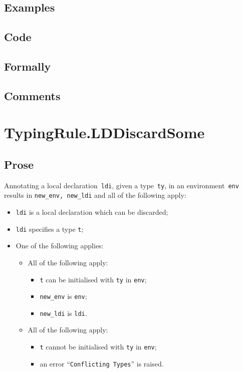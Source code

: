 \documentclass{book}
\begin{document}
  \subsection{Examples}

  \subsection{Code}

  \subsection{Formally}

  \subsection{Comments}

\section{TypingRule.LDDiscardSome \label{sec:TypingRule.LDDiscardSome}}

  \subsection{Prose}
    Annotating a local declaration~\texttt{ldi}, given a type~\texttt{ty}, in
an environment~\texttt{env} results in \texttt{new\_env, new\_ldi} and all of
the following apply:
   \begin{itemize}
   \item \texttt{ldi} is a local declaration which can be discarded;
   \item \texttt{ldi} specifies a type \texttt{t};
   \item One of the following applies:
     \begin{itemize}
     \item All of the following apply:
       \begin{itemize}
       \item \texttt{t} can be initialised with \texttt{ty} in \texttt{env};
       \item \texttt{new\_env} is \texttt{env};
       \item \texttt{new\_ldi} is \texttt{ldi}.
       \end{itemize}
     \item All of the following apply:
       \begin{itemize}
       \item \texttt{t} cannot be initialised with \texttt{ty} in \texttt{env};
       \item an error ``\texttt{Conflicting Types}'' is raised.
       \end{itemize}
     \end{itemize}
   \end{itemize}
\end{document}
